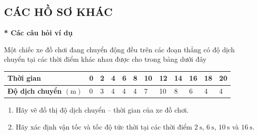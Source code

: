 \subsection{CÁC HỒ SƠ KHÁC}
\textbf{* Các câu hỏi ví dụ}\\
\setcounter{ex}{0}
\begin{ex}
	Một chiếc xe đồ chơi đang chuyển động đều trên các đoạn thẳng có độ dịch chuyển tại các thời điểm khác nhau được cho trong bảng dưới đây
	\begin{center}
		\begin{tabular}{|M{3cm}|M{1cm}|M{1cm}|M{1cm}|M{1cm}|M{1cm}|M{1cm}|M{1cm}|M{1cm}|M{1cm}|M{1cm}|M{1cm}|}
			\hline
			\textbf{Thời gian} & 0 & 2 & 4 & 6 & 8 & 10 & 12 & 14 & 16 & 18 & 20\\
			\hline
			\textbf{Độ dịch chuyển $\left(\si{\meter}\right)$} & 0 & 3 & 4 & 4 & 4 & 7 & 10 & 8 & 6 & 4 & 4\\
			\hline
		\end{tabular}
	\end{center}
	\begin{enumerate}[label=\alph*)]
		\item Hãy vẽ đồ thị độ dịch chuyển – thời gian của xe đồ chơi.
		\item Hãy xác định vận tốc và tốc độ tức thời tại các thời điểm $\SI{2}{\second}$, $\SI{6}{\second}$, $\SI{10}{\second}$ và $\SI{16}{\second}$.
		\end{enumerate}
\end{ex}
